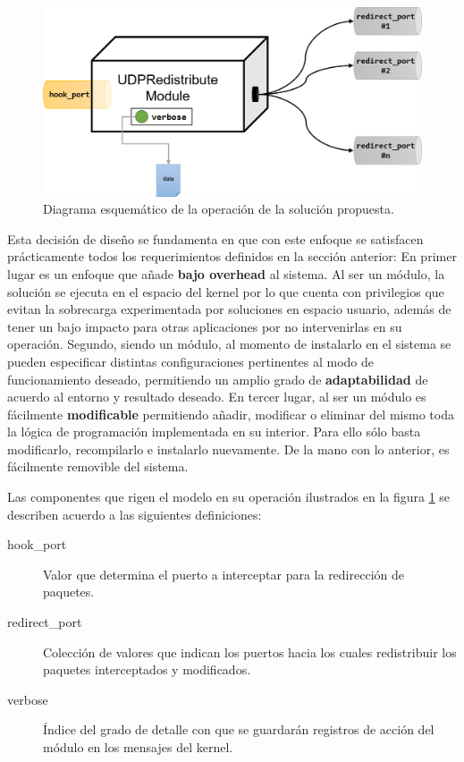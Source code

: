 	\begin{figure}[!h]
		\centering
		\includegraphics[scale=.55]{imagenes/udpredistributemoduleDiagram.png}
		\caption{Diagrama esquemático de la operación de la solución propuesta.}
		\label{fig:modeloUDPRedistribuyeModule}
	\end{figure}

Esta decisión de diseño se fundamenta en que con este enfoque se satisfacen prácticamente todos los requerimientos definidos en la sección anterior: En primer lugar es un enfoque que añade \textbf{bajo overhead} al sistema. Al ser un módulo, la solución se ejecuta en el espacio del kernel por lo que cuenta con privilegios que evitan la sobrecarga experimentada por soluciones en espacio usuario, además de tener un bajo impacto para otras aplicaciones por no intervenirlas en su operación. Segundo, siendo un módulo, al momento de instalarlo en el sistema se pueden especificar distintas configuraciones pertinentes al modo de funcionamiento deseado, permitiendo un amplio grado de \textbf{adaptabilidad} de acuerdo al entorno y resultado deseado. En tercer lugar, al ser un módulo es fácilmente \textbf{modificable} permitiendo añadir, modificar o eliminar del mismo toda la lógica de programación implementada en su interior. Para ello sólo basta modificarlo, recompilarlo e instalarlo nuevamente. De la mano con lo anterior, es fácilmente removible del sistema.

Las componentes que rigen el modelo en su operación ilustrados en la figura \ref{fig:modeloUDPRedistribuyeModule} se describen acuerdo a las siguientes definiciones:


\begin{description}
\item[hook\_port] Valor que determina el puerto a interceptar para la redirección de paquetes.
\item[redirect\_port] Colección de valores que indican los puertos hacia los cuales redistribuir los paquetes interceptados y modificados.
\item[verbose] Índice del grado de detalle con que se guardarán registros de acción del módulo en los mensajes del kernel.
\end{description}


